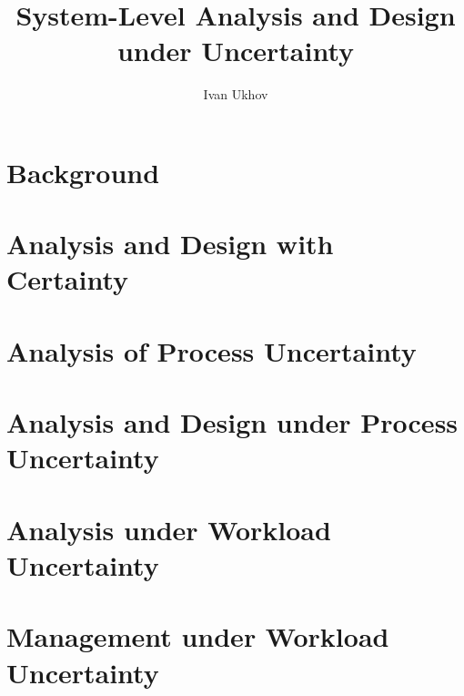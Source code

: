 \documentclass{thesis}
\title{System-Level Analysis and Design under Uncertainty}
\author{Ivan Ukhov}
\begin{document}
\nocite{
  ukhov2012,
  ukhov2014a,
  ukhov2014b,
  ukhov2015,
  ukhov2017a,
  ukhov2017b,
  ukhov2017c,
}

\chapter{\introductiontitle}
\glsresetall
\newcommand{\inputsection}[1]{}


\chapter{Background}
\glsresetall
\renewcommand{\inputsection}[1]{}


\chapter{Analysis and Design with Certainty}
\glsresetall
\renewcommand{\inputsection}[1]{}


\chapter{Analysis of Process Uncertainty}
\glsresetall
\renewcommand{\inputsection}[1]{}


\chapter{Analysis and Design under Process Uncertainty}
\glsresetall
\renewcommand{\inputsection}[1]{}


\chapter{Analysis under Workload Uncertainty}
\glsresetall
\renewcommand{\inputsection}[1]{}


\chapter{Management under Workload Uncertainty}
\glsresetall
\renewcommand{\inputsection}[1]{}

\end{document}
